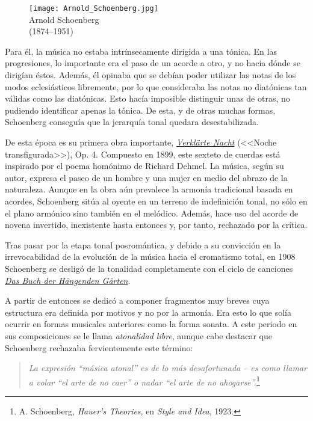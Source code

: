 \begin{figure}
\begin{center}
\texttt{[image: Arnold\_Schoenberg.jpg]}\\
{Arnold Schoenberg\\(1874--1951)}
\end{center}
\end{figure}
Para \'el, la m\'usica no estaba intr\'insecamente dirigida a una t\'onica. En las progresiones, lo importante era el paso de un acorde a otro, y no hacia d\'onde se dirig\'ian \'estos. Adem\'as, \'el opinaba que se deb\'ian poder utilizar las notas de los modos eclesi\'asticos libremente, por lo que consideraba las notas no diat\'onicas tan v\'alidas como las diat\'onicas. Esto hac\'ia imposible distinguir unas de otras, no pudiendo identificar apenas la t\'onica. De esta, y de otras muchas formas, Schoenberg consegu\'ia que la jerarqu\'ia tonal quedara desestabilizada. \cite{kinney}

De esta \'epoca es su primera obra importante, \href{https://www.youtube.com/watch?v=vqODySSxYpc}{\emph{Verkl\"arte Nacht}} (<<{Noche transfigurada}>>), Op. 4. Compuesto en 1899, este sexteto de cuerdas est\'a inspirado por el poema hom\'onimo de Richard Dehmel. La m\'usica, seg\'un su autor, expresa el paseo de un hombre y una mujer en medio del abrazo de la naturaleza.  Aunque en la obra a\'un prevalece la armon\'ia tradicional basada en acordes, Schoenberg sit\'ua al oyente en un terreno de indefinici\'on tonal, no s\'olo en el plano arm\'onico sino tambi\'en en el mel\'odico. Adem\'as, hace uso del acorde de novena invertido, inexistente hasta entonces y, por tanto, rechazado por la cr\'itica. \cite{diaz}

Tras pasar por la etapa tonal posrom\'antica, y debido a su convicci\'on en la irrevocabilidad de la evoluci\'on de la m\'usica hacia el cromatismo total, en 1908 Schoenberg se deslig\'o de la tonalidad completamente con el ciclo de canciones \href{https://www.youtube.com/watch?v=3iXsKhaZB2Q}{\emph{Das Buch der H\"angenden G\"arten}}. 

A partir de entonces se dedic\'o a componer fragmentos muy breves cuya estructura era definida por motivos y no por la armon\'ia. Era esto lo que sol\'ia ocurrir en formas musicales anteriores como la forma sonata. A este periodo en sus composiciones se le llama \emph{atonalidad libre}, aunque cabe destacar que Schoenberg rechazaba fervientemente este t\'ermino:

\begin{quote}
\emph{La expresi\'on ``m\'usica atonal'' es de lo m\'as desafortunada -- es como llamar a volar ``el arte de no caer'' o nadar ``el arte de no ahogarse''.}\footnote{A. Schoenberg, \emph{Hauer's Theories}, en \emph{Style and Idea}, 1923.}
\end{quote}

